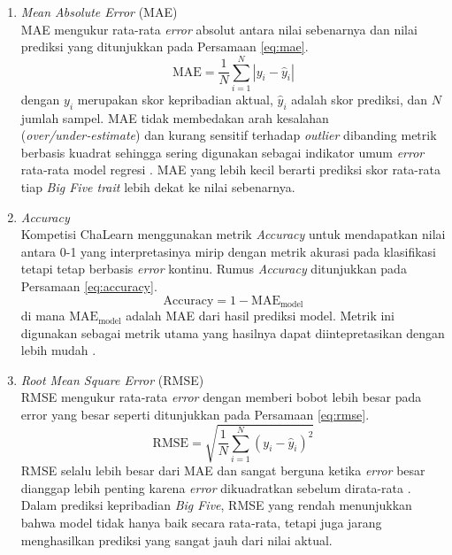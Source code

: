 \begin{enumerate}[nosep, label=\alph*.]
	\item \textit{Mean Absolute Error} (MAE) \\
	MAE mengukur rata-rata \textit{error} absolut antara nilai sebenarnya dan nilai prediksi yang ditunjukkan pada Persamaan \ref{eq:mae}.
	\begin{equation}
		\text{MAE} = \frac{1}{N}\sum_{i=1}^{N} | y_i - \hat{y}_i |
		\label{eq:mae}
	\end{equation}
	dengan $y_i$ merupakan skor kepribadian aktual, $\hat{y}_i$ adalah skor prediksi, dan $N$ jumlah sampel. MAE tidak membedakan arah kesalahan (\textit{over/under‑estimate}) dan kurang sensitif terhadap \textit{outlier} dibanding metrik berbasis kuadrat sehingga sering digunakan sebagai indikator umum \textit{error} rata‑rata model regresi \parencite{Chicco2021}. MAE yang lebih kecil berarti prediksi skor rata-rata tiap \textit{Big Five trait} lebih dekat ke nilai sebenarnya.
	\item \textit{Accuracy} \\
	Kompetisi ChaLearn menggunakan metrik \textit{Accuracy} untuk mendapatkan nilai antara 0-1 yang interpretasinya mirip dengan metrik akurasi pada klasifikasi tetapi tetap berbasis \textit{error} kontinu. Rumus \textit{Accuracy} ditunjukkan pada Persamaan \ref{eq:accuracy}.
	\begin{equation}
		\text{Accuracy} = 1 - \text{MAE}_\text{model}
		\label{eq:accuracy}
	\end{equation}
	di mana $\text{MAE}_\text{model}$ adalah MAE dari hasil prediksi model. Metrik ini digunakan sebagai metrik utama yang hasilnya dapat diintepretasikan dengan lebih mudah \parencite{Ponce-Lpez2016}.
	\item \textit{Root Mean Square Error} (RMSE) \\
	RMSE mengukur rata‑rata \textit{error} dengan memberi bobot lebih besar pada error yang besar seperti ditunjukkan pada Persamaan \ref{eq:rmse}.
	\begin{equation}
		\text{RMSE} = \sqrt{\frac{1}{N}\sum_{i=1}^{N} (y_i - \hat{y}_i)^2}
		\label{eq:rmse}
	\end{equation}
	RMSE selalu lebih besar dari MAE dan sangat berguna ketika \textit{error} besar dianggap lebih penting karena \textit{error} dikuadratkan sebelum dirata-rata \parencite{Chai2014}. Dalam prediksi kepribadian \textit{Big Five}, RMSE yang rendah menunjukkan bahwa model tidak hanya baik secara rata‑rata, tetapi juga jarang menghasilkan prediksi yang sangat jauh dari nilai aktual.

\end{enumerate}

